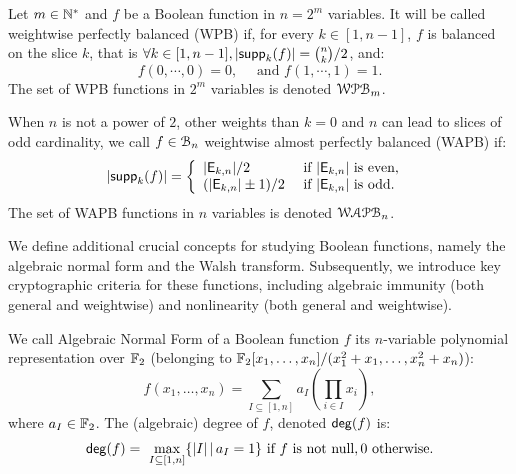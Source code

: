 \documentclass[11pt]{llncs}
\begin{document}
\begin{definition}\label{def:WAPB}
	Let $m\in \mathbb{N}^*$ and $f$ be a Boolean function in $n=2^m$ variables. It will be called weightwise perfectly balanced (WPB) if, for every $k\in[1,n-1]$, $f$ is balanced on the slice $k$, that is $\forall k \in [1,n-1], |\mathsf{supp}_{k}(f)|=\binom{n}{k}/2$, and:
	\[f(0,\cdots,0)=0,\quad \text{ and } f(1,\cdots,1)=1.\]	
	The set of WPB functions in $2^m$ variables is denoted $\mathcal{WPB}_{m}$.
	
	When $n$ is not a power of $2$, other weights than $k=0$ and $n$ can lead to slices of odd cardinality, we call $f\in \mathcal{B}_{n}$ weightwise almost perfectly balanced (WAPB) if: 
	\[|\mathsf{supp}_{k}(f)|= \left \{
	\begin{array}{l l}
	|\mathsf{E}_{k,n}|/2  & \text{ if } |\mathsf{E}_{k,n}| \text{ is even, } \\
	(|\mathsf{E}_{k,n}|\pm 1)/2  & \text{ if }  |\mathsf{E}_{k,n}| \text{ is odd.}
	\end{array}\right.\]
	The set of WAPB functions in $n$ variables is denoted $\mathcal{WAPB}_{n}$.		
\end{definition}



We define additional crucial concepts for studying Boolean functions, namely the algebraic normal form and the Walsh transform. 
Subsequently, we introduce key cryptographic criteria for these functions, including algebraic immunity (both general and weightwise) and nonlinearity (both general and weightwise).

\begin{definition}\label{def:anf}
We call Algebraic Normal Form of a Boolean function $f$ its $n$-variable polynomial representation over $\mathbb{F}_2$ (\ie belonging to $\mathbb{F}_2[x_1,\dots,x_n]/(x_1^2+x_1,\dots,x_n^2+x_n)$):
	\[f(x_1,\dots,x_n)= \sum_{I \subseteq [1,n]} a_I \left( \prod_{i \in I} x_i \right), \]%
	where $a_I\in \mathbb{F}_2$. 
The (algebraic) degree of $f$, denoted $\mathsf{deg}(f)$ is: \[\mathsf{deg}(f)=\
\max_{I\subseteq [1,n]}\{ |I|\, | \, a_I=1\}  \text{ if $f$ is not null},0  \text{ otherwise}.\]
\end{definition}	
\end{document}
